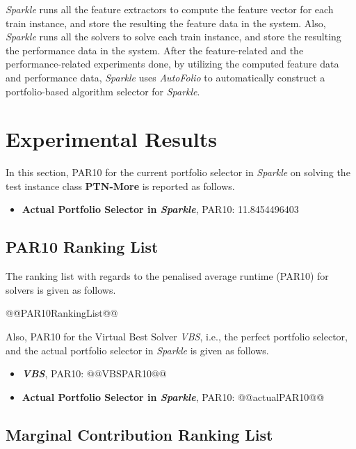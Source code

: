 \documentclass[british]{article}
\begin{document}
\emph{Sparkle} runs all the feature extractors to compute the feature vector for each train instance, and store the resulting the feature data in the system. Also, \emph{Sparkle} runs all the solvers to solve each train instance, and store the resulting the performance data in the system. After the feature-related and the performance-related experiments done, by utilizing the computed feature data and performance data, \emph{Sparkle} uses \emph{AutoFolio} \cite{LinEtAl15} to automatically construct a portfolio-based algorithm selector for \emph{Sparkle}.


\section{Experimental Results}
\label{sec:Experimental_Results}

In this section, PAR10 for the current portfolio selector in \emph{Sparkle} on solving the test instance class \textbf{PTN-More} is reported as follows.

\begin{itemize}
\item \textbf{Actual Portfolio Selector in \emph{Sparkle}}, PAR10: 11.8454496403
\end{itemize}


\iffalse
\subsection{PAR10 Ranking List}
\label{sec:PAR10_Ranking}

The ranking list with regards to the penalised average runtime (PAR10) for solvers is given as follows.

\begin{enumerate}
@@PAR10RankingList@@
\end{enumerate}

Also, PAR10 for the Virtual Best Solver \emph{VBS}, i.e., the perfect portfolio selector, and the actual portfolio selector in \emph{Sparkle} is given as follows.

\begin{itemize}
\item \textbf{\emph{VBS}}, PAR10: @@VBSPAR10@@
\item \textbf{Actual Portfolio Selector in \emph{Sparkle}}, PAR10: @@actualPAR10@@
\end{itemize}

\subsection{Marginal Contribution Ranking List}
\label{sec:Marginal_Contribution_Ranking}
\end{document}
